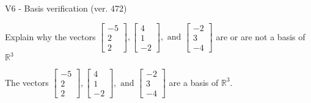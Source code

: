 \begin{exercise}
  \begin{exerciseTitle}V6 - Basis verification (ver. 472)\end{exerciseTitle}
  \begin{exerciseStatement}
    Explain why the vectors \(\left[\begin{array}{r}
-5 \\
2 \\
2
\end{array}\right] , \left[\begin{array}{r}
4 \\
1 \\
-2
\end{array}\right] , \text{ and } \left[\begin{array}{r}
-2 \\
3 \\
-4
\end{array}\right]\) are or are not a basis of \(\mathbb{R}^3\)	


  \end{exerciseStatement}
  \begin{exerciseAnswer}
   The vectors \(\left[\begin{array}{r}
-5 \\
2 \\
2
\end{array}\right] , \left[\begin{array}{r}
4 \\
1 \\
-2
\end{array}\right] , \text{ and } \left[\begin{array}{r}
-2 \\
3 \\
-4
\end{array}\right]\) 
  	 are  a basis of \(\mathbb{R}^3\).
  


  \end{exerciseAnswer}
\end{exercise}